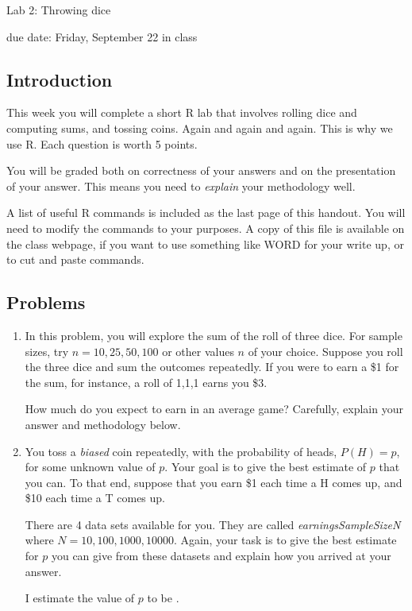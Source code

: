 \documentclass{report}
\begin{document}
{\bf \centerline{{\large Lab 2: Throwing dice}}}

\centerline{due date: Friday, September 22 in class}

\bigskip

\subsection*{Introduction}

This week you will complete a short R lab that involves rolling dice and computing sums,
and tossing coins.  Again and again and again.  This is why we use R.  Each question
is worth 5 points.

You will be graded both on correctness of your answers and on the presentation of
your answer.  This means you need to \emph{explain} your methodology well.

A list of useful R commands is included as the last page of this handout.  You will
need to modify the commands to your purposes.  A copy of this file is available
on the class webpage, if you want to use something like WORD for your write up, 
or to cut and paste commands.

\subsection*{Problems}

\begin{enumerate}

\item In this problem, you will explore the sum of the roll of three dice.
For sample sizes, try $n = 10, 25, 50, 100$ or other values $n$ of your choice.
Suppose you roll the three dice and sum the outcomes repeatedly.  If you
were to earn a \$1 for the sum, for instance, a roll of 1,1,1 earns you
\$3. 

How much do you expect to earn in an average game?
Carefully, explain your answer and methodology below.

\newpage

\item You toss a \emph{biased} coin repeatedly, with the probability of
heads, $P (H) = p$, for some unknown value of $p$.  Your goal is to
give the best estimate of $p$ that you can.  To that end, suppose
that you earn \$1 each time a H comes up, and \$10 each time a T
comes up.

There are 4 data sets available for you.  They are called
\emph{earningsSampleSizeN} where $N = 10, 100, 1000, 10000$.
Again, your task is to give the best estimate for $p$ you can give from
these datasets and explain how you arrived at your answer.

I estimate the value of $p$ to be \underline{\hskip 2cm}.

\end{enumerate}
\end{document}
